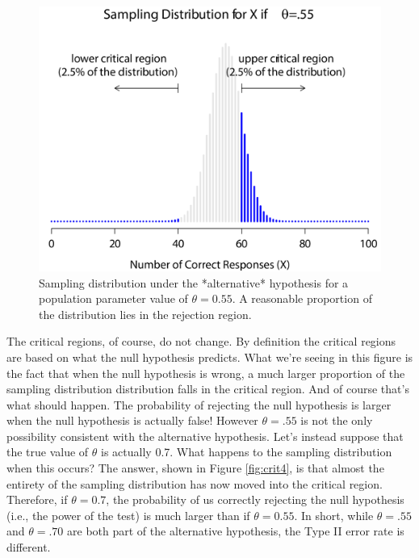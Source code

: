 \documentclass[
]{book}
\begin{document}
\begin{figure}

{\centering \includegraphics[width=1\linewidth]{img/nhst/rejectionRegion3} 

}

\caption{Sampling distribution under the *alternative* hypothesis for a population parameter value of $\theta = 0.55$. A reasonable proportion of the distribution lies in the rejection region.}\label{fig:crit3}
\end{figure}

The critical regions, of course, do not change. By definition the critical regions are based on what the null hypothesis predicts. What we're seeing in this figure is the fact that when the null hypothesis is wrong, a much larger proportion of the sampling distribution distribution falls in the critical region. And of course that's what should happen. The probability of rejecting the null hypothesis is larger when the null hypothesis is actually false! However \(\theta = .55\) is not the only possibility consistent with the alternative hypothesis. Let's instead suppose that the true value of \(\theta\) is actually 0.7. What happens to the sampling distribution when this occurs? The answer, shown in Figure \ref{fig:crit4}, is that almost the entirety of the sampling distribution has now moved into the critical region. Therefore, if \(\theta = 0.7\), the probability of us correctly rejecting the null hypothesis (i.e., the power of the test) is much larger than if \(\theta = 0.55\). In short, while \(\theta = .55\) and \(\theta = .70\) are both part of the alternative hypothesis, the Type II error rate is different.
\end{document}
